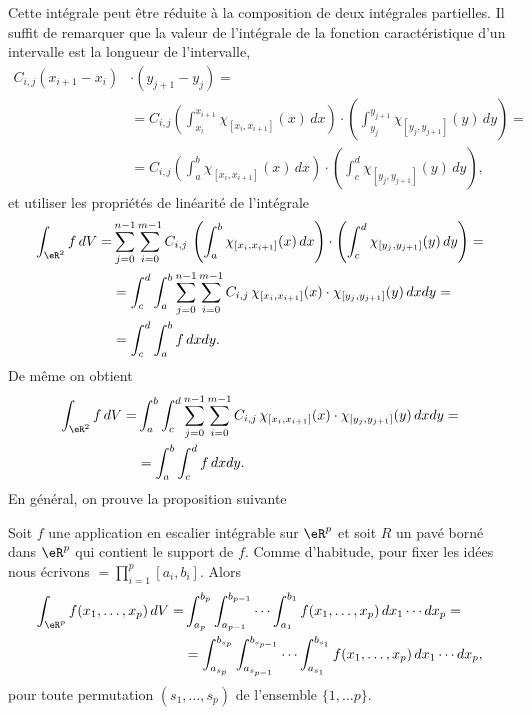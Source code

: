 Cette intégrale peut être réduite à la composition de deux intégrales partielles. Il suffit de remarquer que la valeur de l'intégrale de la fonction caractéristique d'un intervalle est la longueur de l'intervalle,
\begin{equation}
  \begin{aligned}
    C_{i,j}(x_{i+1}-x_i)&\cdot(y_{j+1}-y_j)=\\
&=C_{i,j}\left(\int_{x_i}^{x_{i+1}}\chi_{[x_{i},x_{i+1}]}(x)\, dx \right)\cdot \left(\int_{y_j}^{y_{j+1}}\chi_{[y_{ j},y_{ j+1}]}(y)\, dy \right)=\\
&=C_{i,j}\left(\int_{a}^{b}\chi_{[x_{i},x_{i+1}]}(x)\, dx \right)\cdot \left(\int_{c}^{d}\chi_{[y_{ j},y_{ j+1}]}(y)\, dy \right),
  \end{aligned}
\end{equation}
et utiliser les propriétés de linéarité de l'intégrale
\begin{equation}
  \begin{aligned}
   \int_{\eR^2}f \,dV =& \sum_{j=0}^{n-1}\sum_{i=0}^{m-1}C_{i,j}\,\left(\int_{a}^{b}\chi_{[x_{i},x_{i+1}]}(x)\, dx \right)\cdot \left(\int_{c}^{d}\chi_{[y_{ j},y_{ j+1}]}(y)\, dy \right)=\\
&=\int_{c}^{d}\int_{a}^{b}\sum_{j=0}^{n-1}\sum_{i=0}^{m-1}C_{i,j}\,\chi_{[x_{i},x_{i+1}]}(x)\cdot \chi_{[y_{ j},y_{ j+1}]}(y)\, dx dy=\\
&=\int_{c}^{d}\int_{a}^{b} f\, dx dy.
  \end{aligned}
\end{equation}
De même on obtient
\begin{equation}
  \begin{aligned}
   \int_{\eR^2}f \,dV =&\int_{a}^{b}\int_{c}^{d}\sum_{j=0}^{n-1}\sum_{i=0}^{m-1}C_{i,j}\,\chi_{[x_{i},x_{i+1}]}(x)\cdot \chi_{[y_{ j},y_{ j+1}]}(y)\, dx dy=\\
&=\int_{a}^{b}\int_{c}^{d} f\, dx dy.
  \end{aligned}
\end{equation}
En général, on prouve la proposition suivante
\begin{proposition}
 Soit $f$ une application en escalier intégrable sur $\eR^p$ et soit $R$ un pavé borné dans $\eR^p$ qui contient le support de $f$. Comme d'habitude, pour fixer les idées nous écrivons $=\prod_{i=1}^p[a_i,b_i]$. Alors
 \begin{equation}
   \begin{aligned}
     \int_{\eR^p}f(x_1,\ldots, x_p) \, dV =& \int_{a_p}^{b_p}\int_{a_{p-1}}^{b_{p-1}}\cdots\int_{a_1}^{b_1} f(x_1,\ldots, x_p) \, dx_1\cdots dx_p=\\
&=\int_{a_{s_p}}^{b_{s_p}}\int_{a_{s_{p-1}}}^{b_{s_{p-1}}}\cdots\int_{a_{s_1}}^{b_{s_1}} f(x_1,\ldots, x_p) \, dx_1\cdots dx_p,
   \end{aligned}
 \end{equation}
pour toute permutation $(s_1,\ldots,s_p)$ de l'ensemble $\{1,\ldots p\}$.
\end{proposition}

